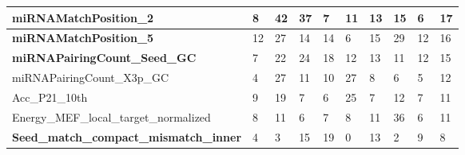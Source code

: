 \documentclass{bmcart}
\begin{document}
\begin{table}[h!]
\begin{tabular}{|l|l|l|l|l|l|l|l|l|l|}
\textbf{miRNAMatchPosition\_2}                    & 8            & 42           & 37           & 7           & 11          & 13          & 15          & 6           & 17            \\ \hline
\textbf{miRNAMatchPosition\_5}                    & 12           & 27           & 14           & 14          & 6           & 15          & 29          & 12          & 16            \\ \hline
\textbf{miRNAPairingCount\_Seed\_GC}              & 7            & 22           & 24           & 18          & 12          & 13          & 11          & 12          & 15            \\ \hline
miRNAPairingCount\_X3p\_GC                        & 4            & 27           & 11           & 10          & 27          & 8           & 6           & 5           & 12            \\ \hline
Acc\_P21\_10th                                    & 9            & 19           & 7            & 6           & 25          & 7           & 12          & 7           & 11            \\ \hline
Energy\_MEF\_local\_target\_normalized            & 8            & 11           & 6            & 7           & 8           & 11          & 36          & 6           & 11            \\ \hline
\textbf{Seed\_match\_compact\_mismatch\_inner}    & 4            & 3            & 15           & 19          & 0           & 13          & 2           & 9           & 8             \\ \hline
\end{tabular}
\end{table}
\end{document}
